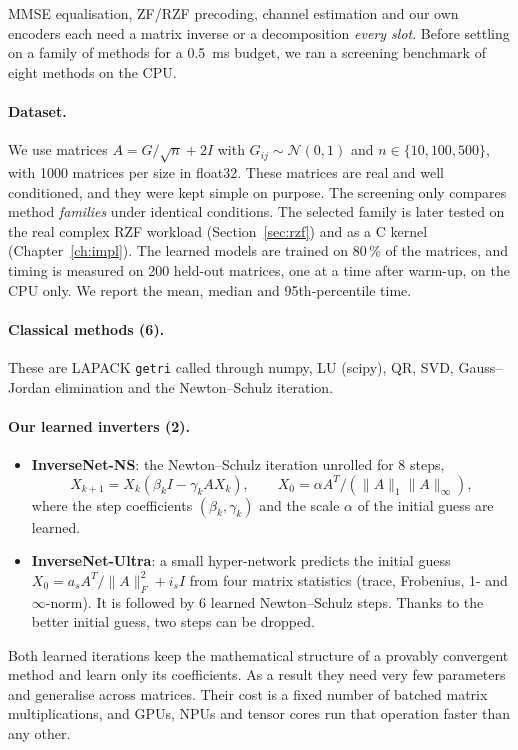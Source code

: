 MMSE equalisation, ZF/RZF precoding, channel estimation and our own encoders each need a matrix inverse or a decomposition \emph{every slot}. Before settling on a family of methods for a 0.5~ms budget, we ran a screening benchmark of eight methods on the CPU.

\paragraph{Dataset.} We use matrices $A = G/\sqrt{n} + 2I$ with $G_{ij}\sim\mathcal N(0,1)$ and $n \in \{10, 100, 500\}$, with 1000 matrices per size in float32. These matrices are real and well conditioned, and they were kept simple on purpose. The screening only compares method \emph{families} under identical conditions. The selected family is later tested on the real complex RZF workload (Section~\ref{sec:rzf}) and as a C kernel (Chapter~\ref{ch:impl}). The learned models are trained on 80\,\% of the matrices, and timing is measured on 200 held-out matrices, one at a time after warm-up, on the CPU only. We report the mean, median and 95th-percentile time.

\paragraph{Classical methods (6).} These are LAPACK \texttt{getri} called through numpy, LU (scipy), QR, SVD, Gauss--Jordan elimination and the Newton--Schulz iteration.

\paragraph{Our learned inverters (2).}
\begin{itemize}
  \item \textbf{InverseNet-NS}: the Newton--Schulz iteration unrolled for 8 steps,
  \[ X_{k+1} = X_k(\beta_k I - \gamma_k A X_k), \qquad X_0 = \alpha A^T/(\|A\|_1\|A\|_\infty), \]
  where the step coefficients $(\beta_k,\gamma_k)$ and the scale $\alpha$ of the initial guess are learned.
  \item \textbf{InverseNet-Ultra}: a small hyper-network predicts the initial guess $X_0 = a_s A^T/\|A\|_F^2 + i_s I$ from four matrix statistics (trace, Frobenius, 1- and $\infty$-norm). It is followed by 6 learned Newton--Schulz steps. Thanks to the better initial guess, two steps can be dropped.
\end{itemize}
Both learned iterations keep the mathematical structure of a provably convergent method and learn only its coefficients. As a result they need very few parameters and generalise across matrices. Their cost is a fixed number of batched matrix multiplications, and GPUs, NPUs and tensor cores run that operation faster than any other.

